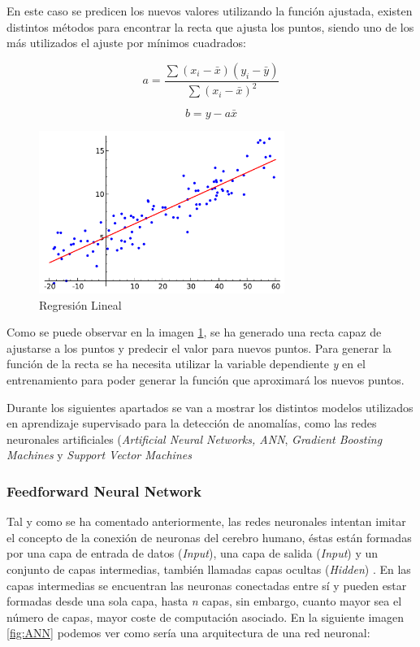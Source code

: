 En este caso se predicen los nuevos valores utilizando la función ajustada, existen distintos métodos para encontrar la recta que ajusta los puntos, siendo uno de los más utilizados el ajuste por mínimos cuadrados:

\begin{equation}
    a = \frac{\sum(x_i - \bar{x}) (y_i - \bar{y})} {\sum(x_i - \bar{x})^2}
\end{equation}

\begin{equation}
    b = y - a \bar{x}
\end{equation}

\begin{figure}[H]
	\centering
	\includegraphics[width=8cm]{figs/Linear_regression.png}
	\caption{Regresión Lineal}
	\label{fig:reglin}
\end{figure}

Como se puede observar en la imagen \ref{fig:reglin}, se ha generado una recta capaz de ajustarse a los puntos y predecir el valor para nuevos puntos. Para generar la función de la recta se ha necesita utilizar la variable dependiente \textit{y} en el entrenamiento para poder generar la función que aproximará los nuevos puntos. 

Durante los siguientes apartados se van a mostrar los distintos modelos utilizados en aprendizaje supervisado para la detección de anomalías, como las redes neuronales artificiales (\textit{Artificial Neural Networks, ANN}, \textit{Gradient Boosting Machines} y \textit{Support Vector Machines}

\subsubsection{Feedforward Neural Network}

Tal y como se ha comentado anteriormente, las redes neuronales intentan imitar el concepto de la conexión de neuronas del cerebro humano, éstas están formadas por una capa de entrada de datos (\textit{Input}), una capa de salida (\textit{Input}) y un conjunto de capas intermedias, también llamadas capas ocultas (\textit{Hidden}) \cite{haykin1994neural}. En las capas intermedias se encuentran las neuronas conectadas entre sí y pueden estar formadas desde una sola capa, hasta \textit{n} capas, sin embargo, cuanto mayor sea el número de capas, mayor coste de computación asociado. En la siguiente imagen \ref{fig:ANN} podemos ver como sería una arquitectura de una red neuronal:

